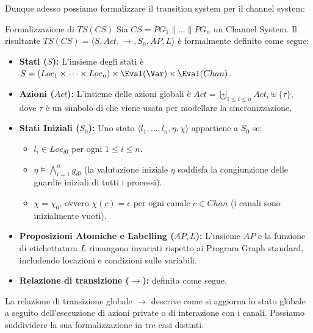 Dunque adesso possiamo formalizzare il transition system per il channel system:

\begin{definition}{Formalizzazione di \(TS(CS)\)}
  Sia \(CS = PG_1 \parallel \dots \parallel PG_n\) un Channel System. Il  risultante \(TS(CS) = \langle S, Act, \to, S_0, AP, L \rangle\) è formalmente definito come segue:

  \begin{itemize}
    \item \textbf{Stati (\(S\)):} L'insieme degli stati è \(S = (Loc_1 \times \cdots \times Loc_n) \times \Eval(\Var) \times \Eval(Chan)\).
    \item \textbf{Azioni (\(Act\)):} L'insieme delle azioni globali è \(Act = \biguplus_{1 \le i \le n} Act_i \uplus \{\tau\}\), dove \(\tau\) è un simbolo di  che viene usata per modellare la sincronizzazione.
    \item \textbf{Stati Iniziali (\(S_0\)):} Uno stato \(\langle l_1, \dots, l_n, \eta, \chi \rangle\) appartiene a \(S_0\) se:
          \begin{itemize}
            \item \(l_i \in Loc_{i0}\) per ogni \(1 \le i \le n\).
            \item \(\eta \models \bigwedge_{i=1}^n g_{i0}\) (la valutazione iniziale \(\eta\) soddisfa la congiunzione delle guardie iniziali di tutti i processi).
            \item \(\chi = \chi_0\), ovvero \(\chi(c) = \epsilon\) per ogni canale \(c \in Chan\) (i canali sono inizialmente vuoti).
          \end{itemize}
    \item \textbf{Proposizioni Atomiche e Labelling (\(AP, L\)):} L'insieme \(AP\) e la funzione di etichettatura \(L\) rimangono invariati rispetto ai Program Graph standard, includendo locazioni e condizioni sulle variabili.
    \item \textbf{Relazione di transizione (\(\to\)):} definita come segue.
  \end{itemize}
\end{definition}

La relazione di transizione globale \(\to\) descrive come si aggiorna lo stato globale a seguito dell'esecuzione di azioni private o di interazione con i canali. Possiamo suddividere la sua formalizzazione in tre casi distinti.

